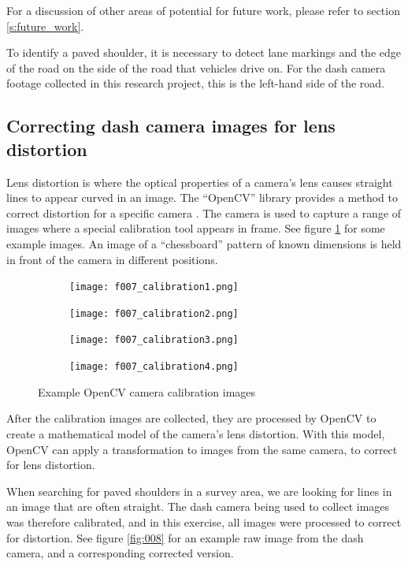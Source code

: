 \documentclass[11pt,twoside]{report}
\begin{document}
For a discussion of other areas of potential for future work, please refer to section \ref{s:future_work}.

To identify a paved shoulder, it is necessary to detect lane markings and the edge of the road on the side of the road that vehicles drive on.  For the dash camera footage collected in this research project, this is the left-hand side of the road.


\subsection{Correcting dash camera images for lens distortion}
\label{s:rq4a}

Lens distortion is where the optical properties of a camera's lens causes straight lines to appear curved in an image.  The ``OpenCV'' library provides a method to correct distortion for a specific camera \cite{distortion}.  The camera is used to capture a range of images where a special calibration tool appears in frame.  See figure \ref{fig:calibration} for some example images.  An image of a ``chessboard'' pattern of known dimensions is held in front of the camera in different positions.

\begin{figure}[h]
\centering
\begin{subfigure}{0.24\textwidth}
	\texttt{[image: f007\_calibration1.png]}
\end{subfigure}
\hfill
\begin{subfigure}{0.24\textwidth}
	\texttt{[image: f007\_calibration2.png]}
\end{subfigure}
\hfill
\begin{subfigure}{0.24\textwidth}
	\texttt{[image: f007\_calibration3.png]}
\end{subfigure}
\hfill
\begin{subfigure}{0.24\textwidth}
	\texttt{[image: f007\_calibration4.png]}
\end{subfigure}
\caption{Example OpenCV camera calibration images}
\label{fig:calibration}
\end{figure}

After the calibration images are collected, they are processed by OpenCV to create a mathematical model of the camera's lens distortion.  With this model, OpenCV can apply a transformation to images from the same camera, to correct for lens distortion.

When searching for paved shoulders in a survey area, we are looking for lines in an image that are often straight.  The dash camera being used to collect images was therefore calibrated, and in this exercise, all images were processed to correct for distortion.  See figure \ref{fig:008} for an example raw image from the dash camera, and a corresponding corrected version.
\end{document}
